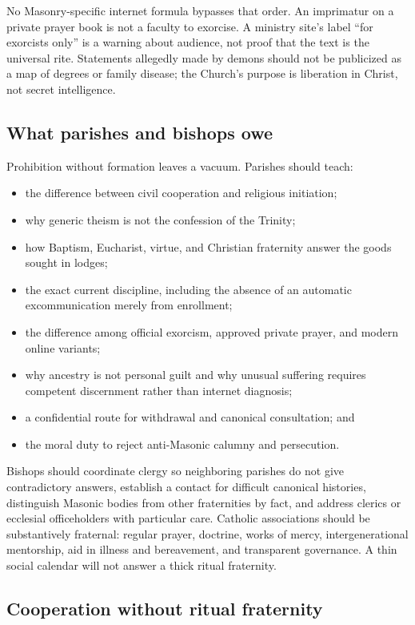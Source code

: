 No Masonry-specific internet formula bypasses that order. An imprimatur on a private prayer book is not a faculty to exorcise. A ministry site's label “for exorcists only” is a warning about audience, not proof that the text is the universal rite. Statements allegedly made by demons should not be publicized as a map of degrees or family disease; the Church's purpose is liberation in Christ, not secret intelligence.

\subsection{What parishes and bishops owe}

Prohibition without formation leaves a vacuum. Parishes should teach:

\begin{itemize}
\item the difference between civil cooperation and religious initiation;
\item why generic theism is not the confession of the Trinity;
\item how Baptism, Eucharist, virtue, and Christian fraternity answer the goods sought in lodges;
\item the exact current discipline, including the absence of an automatic excommunication merely from enrollment;
\item the difference among official exorcism, approved private prayer, and modern online variants;
\item why ancestry is not personal guilt and why unusual suffering requires competent discernment rather than internet diagnosis;
\item a confidential route for withdrawal and canonical consultation; and
\item the moral duty to reject anti-Masonic calumny and persecution.
\end{itemize}

Bishops should coordinate clergy so neighboring parishes do not give contradictory answers, establish a contact for difficult canonical histories, distinguish Masonic bodies from other fraternities by fact, and address clerics or ecclesial officeholders with particular care. Catholic associations should be substantively fraternal: regular prayer, doctrine, works of mercy, intergenerational mentorship, aid in illness and bereavement, and transparent governance. A thin social calendar will not answer a thick ritual fraternity.

\subsection{Cooperation without ritual fraternity}

